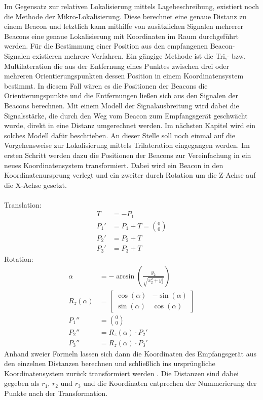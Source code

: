Im Gegensatz zur relativen Lokalisierung mittels Lagebeschreibung, existiert noch die Methode der Mikro-Lokalisierung. Diese berechnet eine genaue Distanz zu einem Beacon und letztlich kann mithilfe von zusätzlichen Signalen mehrerer Beacons eine genaue Lokalisierung mit Koordinaten im Raum  durchgeführt werden. Für die Bestimmung einer Position aus den empfangenen Beacon-Signalen existieren mehrere Verfahren. Ein gängige Methode ist die Tri,- bzw. Multilateration die aus der Entfernung eines Punktes zwischen drei oder mehreren Orientierungspunkten dessen Position in einem Koordinatensystem bestimmt. In diesem Fall wären es die Positionen der Beacons die Orientierungspunkte und die Entfernungen ließen sich aus den Signalen der Beacons berechnen. Mit einem Modell der Signalausbreitung wird dabei die Signalsstärke, die durch den Weg vom Beacon zum Empfangsgerät geschwächt wurde, direkt in eine Distanz umgerechnet werden. Im nächsten Kapitel wird ein solches Modell dafür beschrieben. An dieser Stelle soll noch einmal auf die Vorgehensweise zur Lokalisierung mittels Trilateration eingegangen werden. Im ersten Schritt werden dazu die Positionen der Beacons zur Vereinfachung in ein neues Koordinatensystem transformiert. Dabei wird ein Beacon in den Koordinatenursprung verlegt und ein zweiter durch Rotation um die Z-Achse auf die X-Achse gesetzt.\\ \\
Translation:
\begin{align*}
T &= -P_1\\
P_1' &= P_1 + T = \binom{0}{0}\\
P_2' &= P_2 + T\\
P_3' &= P_3 + T
\end{align*} 
Rotation:
\begin{align*}
\alpha &= -\arcsin \left ( \frac{y_2}{\sqrt{x_2^2+y_2^2}} \right )\\
R_z\left ( \alpha \right ) &= \begin{bmatrix}
\cos\left ( \alpha \right ) & -\sin\left ( \alpha \right )\\ 
\sin\left ( \alpha \right ) & \cos\left ( \alpha \right )
\end{bmatrix}\\
P_1'' &= \binom{0}{0}\\
P_2'' &= R_z\left ( \alpha \right ) \cdot P_2'\\
P_3'' &= R_z\left ( \alpha \right ) \cdot P_3'
\end{align*}
Anhand zweier Formeln lassen sich dann die Koordinaten des Empfangsgerät aus den einzelnen Distanzen berechnen und schließlich ins ursprüngliche Koordinatensystem zurück transformiert werden \cite{Trilat}. Die Distanzen sind dabei gegeben als $r_1$, $r_2$ und $r_3$ und die Koordinaten entprechen der Nummerierung der Punkte nach der Transformation.
